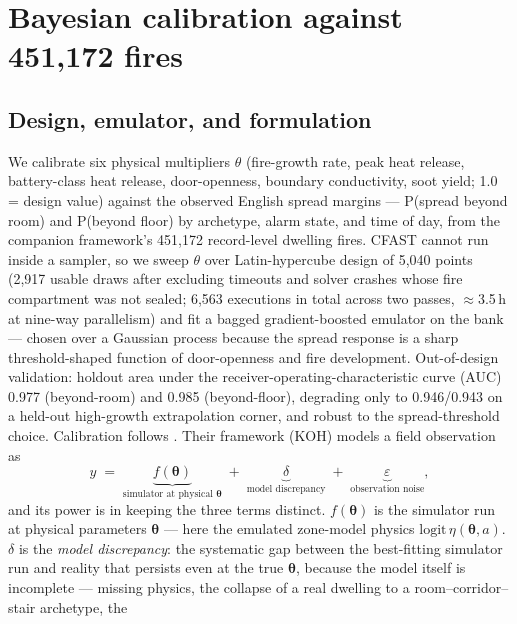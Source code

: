\documentclass[11pt]{article}
\begin{document}
\section{Bayesian calibration against 451{,}172 fires}
\label{sec:calibration}

\subsection{Design, emulator, and formulation}

We calibrate six physical multipliers $\theta$ (fire-growth rate, peak heat
release, battery-class heat release, door-openness, boundary conductivity, soot
yield; 1.0 = design value) against the observed English spread margins ---
P(spread beyond room) and P(beyond floor) by archetype, alarm state, and time
of day, from the companion framework's 451{,}172 record-level dwelling fires.
CFAST cannot run inside a sampler, so we sweep $\theta$ over Latin-hypercube
design of 5{,}040 points (2{,}917 usable draws after excluding timeouts and
solver crashes whose fire compartment was not sealed; 6{,}563 executions in
total across two passes, $\approx$3.5\,h at nine-way parallelism) and fit a
bagged gradient-boosted emulator on the bank --- chosen over a Gaussian process
because the spread response is a sharp threshold-shaped function of
door-openness and fire development. Out-of-design validation: holdout area under
the receiver-operating-characteristic curve (AUC) 0.977 (beyond-room) and
0.985 (beyond-floor), degrading only to 0.946/0.943 on a held-out
high-growth extrapolation corner, and robust to the spread-threshold choice.
Calibration follows \citet{kennedy2001}. Their framework (KOH) models a field
observation as
\begin{equation}
  y \;=\;
  \underbrace{f(\boldsymbol\theta)}_{\text{simulator at physical }\boldsymbol\theta}
  \;+\;
  \underbrace{\delta}_{\text{model discrepancy}}
  \;+\;
  \underbrace{\varepsilon}_{\text{observation noise}},
  \label{eq:koh-canonical}
\end{equation}
and its power is in keeping the three terms distinct. $f(\boldsymbol\theta)$ is
the simulator run at physical parameters $\boldsymbol\theta$ --- here the
emulated zone-model physics $\mathrm{logit}\,\eta(\boldsymbol\theta,a)$.
$\delta$ is the \emph{model discrepancy}: the systematic gap between the
best-fitting simulator run and reality that persists even at the true
$\boldsymbol\theta$, because the model itself is incomplete --- missing physics,
the collapse of a real dwelling to a room--corridor--stair archetype, the
\end{document}

